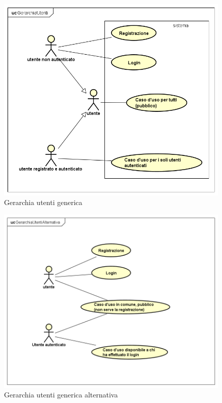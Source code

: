 \documentclass[a4paper,11pt]{article}
\begin{document}
		\begin{figure} [h]
			\centering
			\includegraphics[scale=0.50]{UseCasePattern/GerarchiaUtenti/GerarchiaUtenti}
			\caption{Gerarchia utenti generica}
		\end{figure}
		
		\begin{figure}
			\centering
			\includegraphics[scale=0.5]{UseCasePattern/GerarchiaUtentiAlternativa/GerarchiaUtentiAlternativa}
			\caption{Gerarchia utenti generica alternativa}
		\end{figure}
					
\end{document}
